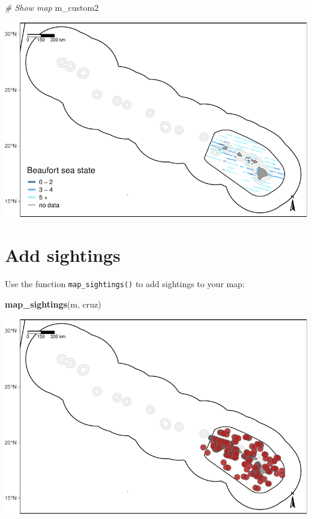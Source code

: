 \documentclass[
]{book}
\newenvironment{Shaded}{\begin{snugshade}}{\end{snugshade}}
\newcommand{\CommentTok}[1]{\textcolor[rgb]{0.56,0.35,0.01}{\textit{#1}}}
\newcommand{\KeywordTok}[1]{\textcolor[rgb]{0.13,0.29,0.53}{\textbf{#1}}}
\newcommand{\NormalTok}[1]{#1}
\begin{document}
\begin{Shaded}
\begin{Highlighting}[]
\CommentTok{# Show map}
\NormalTok{m_custom2}
\end{Highlighting}
\end{Shaded}

\includegraphics{figures/unnamed-chunk-60-1.pdf}

\hypertarget{add-sightings}{%
\section*{Add sightings}\label{add-sightings}}

Use the function \texttt{map\_sightings()} to add sightings to your map:

\begin{Shaded}
\begin{Highlighting}[]
\KeywordTok{map_sightings}\NormalTok{(m, cruz)}
\end{Highlighting}
\end{Shaded}

\includegraphics{figures/unnamed-chunk-61-1.pdf}
\end{document}
